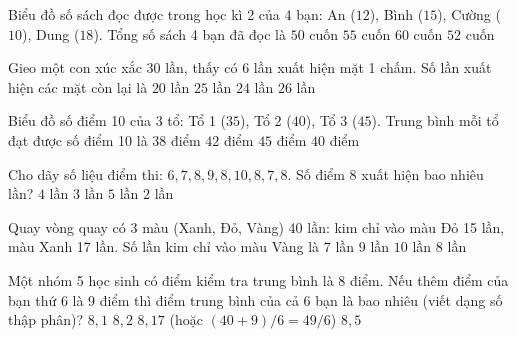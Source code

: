\begin{ex} %
Biểu đồ số sách đọc được trong học kì 2 của 4 bạn: An ($12$), Bình ($15$), Cường ($10$), Dung ($18$). Tổng số sách 4 bạn đã đọc là
\choice
{$50$ cuốn}
{\True $55$ cuốn}
{$60$ cuốn}
{$52$ cuốn}
\end{ex}

\begin{ex} %
Gieo một con xúc xắc 30 lần, thấy có 6 lần xuất hiện mặt 1 chấm. Số lần xuất hiện các mặt còn lại là
\choice
{$20$ lần}
{$25$ lần}
{\True $24$ lần}
{$26$ lần}
\end{ex}

\begin{ex} %
Biểu đồ số điểm 10 của 3 tổ: Tổ 1 ($35$), Tổ 2 ($40$), Tổ 3 ($45$). Trung bình mỗi tổ đạt được số điểm 10 là
\choice
{$38$ điểm}
{$42$ điểm}
{$45$ điểm}
{\True $40$ điểm}
\end{ex}

\begin{ex} %
Cho dãy số liệu điểm thi: $6, 7, 8, 9, 8, 10, 8, 7, 8$. Số điểm 8 xuất hiện bao nhiêu lần?
\choice
{\True $4$ lần}
{$3$ lần}
{$5$ lần}
{$2$ lần}
\end{ex}

\begin{ex} %
Quay vòng quay có 3 màu (Xanh, Đỏ, Vàng) 40 lần: kim chỉ vào màu Đỏ 15 lần, màu Xanh 17 lần. Số lần kim chỉ vào màu Vàng là
\choice
{$7$ lần}
{$9$ lần}
{$10$ lần}
{\True $8$ lần}
\end{ex}

\begin{ex} %
Một nhóm 5 học sinh có điểm kiểm tra trung bình là 8 điểm. Nếu thêm điểm của bạn thứ 6 là 9 điểm thì điểm trung bình của cả 6 bạn là bao nhiêu (viết dạng số thập phân)?
\choice
{$8{,}1$}
{$8{,}2$}
{\True $8{,}17$ (hoặc $(40+9)/6 = 49/6$)}
{$8{,}5$}
\end{ex}

